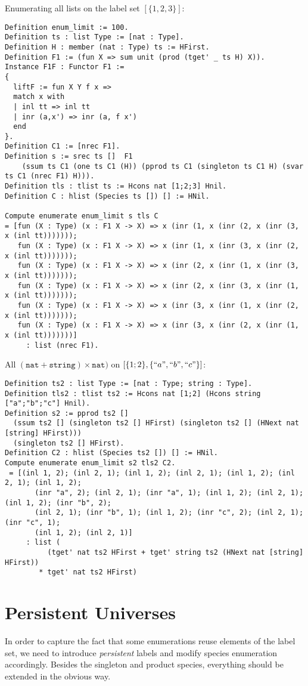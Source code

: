 \documentclass[11pt]{article}
\newcommand{\irl}[1]{\mathtt{#1}}
\begin{document}
Enumerating all lists on the label set $[\{1,2,3\}]$:

\begin{verbatim}
Definition enum_limit := 100.
Definition ts : list Type := [nat : Type].
Definition H : member (nat : Type) ts := HFirst.
Definition F1 := (fun X => sum unit (prod (tget' _ ts H) X)).
Instance F1F : Functor F1 := 
{
  liftF := fun X Y f x => 
  match x with 
  | inl tt => inl tt
  | inr (a,x') => inr (a, f x')
  end
}.
Definition C1 := [nrec F1].
Definition s := srec ts []  F1 
	(ssum ts C1 (one ts C1 (H)) (pprod ts C1 (singleton ts C1 H) (svar ts C1 (nrec F1) H))).
Definition tls : tlist ts := Hcons nat [1;2;3] Hnil.
Definition C : hlist (Species ts []) [] := HNil.

Compute enumerate enum_limit s tls C
= [fun (X : Type) (x : F1 X -> X) => x (inr (1, x (inr (2, x (inr (3, x (inl tt)))))));
   fun (X : Type) (x : F1 X -> X) => x (inr (1, x (inr (3, x (inr (2, x (inl tt)))))));
   fun (X : Type) (x : F1 X -> X) => x (inr (2, x (inr (1, x (inr (3, x (inl tt)))))));
   fun (X : Type) (x : F1 X -> X) => x (inr (2, x (inr (3, x (inr (1, x (inl tt)))))));
   fun (X : Type) (x : F1 X -> X) => x (inr (3, x (inr (1, x (inr (2, x (inl tt)))))));
   fun (X : Type) (x : F1 X -> X) => x (inr (3, x (inr (2, x (inr (1, x (inl tt)))))))]
     : list (nrec F1).

\end{verbatim}

All $(\irl{nat} + \irl{string}) \times \irl{nat})$ on $[\{1;2\},\{``a",``b",``c"\}]$:

\begin{verbatim}
Definition ts2 : list Type := [nat : Type; string : Type].
Definition tls2 : tlist ts2 := Hcons nat [1;2] (Hcons string ["a";"b";"c"] Hnil).
Definition s2 := pprod ts2 [] 
  (ssum ts2 [] (singleton ts2 [] HFirst) (singleton ts2 [] (HNext nat [string] HFirst))) 
  (singleton ts2 [] HFirst).
Definition C2 : hlist (Species ts2 []) [] := HNil.
Compute enumerate enum_limit s2 tls2 C2.
 = [(inl 1, 2); (inl 2, 1); (inl 1, 2); (inl 2, 1); (inl 1, 2); (inl 2, 1); (inl 1, 2); 
       (inr "a", 2); (inl 2, 1); (inr "a", 1); (inl 1, 2); (inl 2, 1); (inl 1, 2); (inr "b", 2); 
       (inl 2, 1); (inr "b", 1); (inl 1, 2); (inr "c", 2); (inl 2, 1); (inr "c", 1); 
       (inl 1, 2); (inl 2, 1)]
     : list (
          (tget' nat ts2 HFirst + tget' string ts2 (HNext nat [string] HFirst)) 
        * tget' nat ts2 HFirst)
\end{verbatim}

\section{Persistent Universes}
In order to capture the fact that some enumerations reuse elements of the label set, we need to introduce
\emph{persistent} labels and modify species enumeration accordingly. Besides the singleton and 
product species, everything should be extended in the obvious way.
\end{document}

